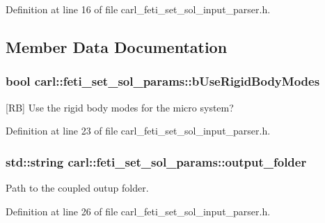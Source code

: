 Definition at line 16 of file carl\+\_\+feti\+\_\+set\+\_\+sol\+\_\+input\+\_\+parser.\+h.



\subsection{Member Data Documentation}
\hypertarget{structcarl_1_1feti__set__sol__params_aecd85116814599f3edb193f4dabfaf49}{}
\subsubsection[{b\+Use\+Rigid\+Body\+Modes}]{\setlength{\rightskip}{0pt plus 5cm}bool carl\+::feti\+\_\+set\+\_\+sol\+\_\+params\+::b\+Use\+Rigid\+Body\+Modes}\label{structcarl_1_1feti__set__sol__params_aecd85116814599f3edb193f4dabfaf49}


\mbox{[}R\+B\mbox{]} Use the rigid body modes for the micro system? 



Definition at line 23 of file carl\+\_\+feti\+\_\+set\+\_\+sol\+\_\+input\+\_\+parser.\+h.

\hypertarget{structcarl_1_1feti__set__sol__params_a7adec03a37edb92e1519066423844ccd}{}
\subsubsection[{output\+\_\+folder}]{\setlength{\rightskip}{0pt plus 5cm}std\+::string carl\+::feti\+\_\+set\+\_\+sol\+\_\+params\+::output\+\_\+folder}\label{structcarl_1_1feti__set__sol__params_a7adec03a37edb92e1519066423844ccd}


Path to the coupled outup folder. 



Definition at line 26 of file carl\+\_\+feti\+\_\+set\+\_\+sol\+\_\+input\+\_\+parser.\+h.

\hypertarget{structcarl_1_1feti__set__sol__params_ab6ddbeabd05fc4250a25c3c7f8efcdb9}{}
